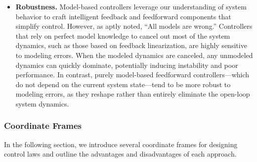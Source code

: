 \begin{itemize}
    \item \textbf{Robustness.} 
    Model-based controllers leverage our understanding of system behavior to craft intelligent feedback and feedforward components that simplify control. However, as \citet{box1976science} aptly noted, “All models are wrong.” Controllers that rely on perfect model knowledge to cancel out most of the system dynamics, such as those based on feedback linearization, are highly sensitive to modeling errors. When the modeled dynamics are canceled, any unmodeled dynamics can quickly dominate, potentially inducing instability and poor performance. In contrast, purely model-based feedforward controllers—which do not depend on the current system state—tend to be more robust to modeling errors, as they reshape rather than entirely eliminate the open-loop system dynamics.
\end{itemize}

\subsubsection{Coordinate Frames}
In the following section, we introduce several coordinate frames for designing control laws and outline the advantages and disadvantages of each approach.


